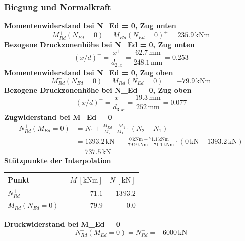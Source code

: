 \documentclass[11pt,a4paper]{article}
\begin{document}
\subsubsection{Biegung und Normalkraft}
\noindent\textbf{Momentenwiderstand bei N\_Ed = 0, Zug unten}
\begin{equation*}
M_{Rd}^{+}(N_{Ed} = 0) = M_{Rd}(N_{Ed}=0)^{+} = 235.9\,\mathrm{kNm}
\end{equation*}
\noindent\textbf{Bezogene Druckzonenhöhe bei N\_Ed = 0, Zug unten}
\begin{equation*}
\left(x/d\right)^{+} = \frac{x^{+}}{d_{2,x}} = \frac{62.7\,\mathrm{mm}}{248.1\,\mathrm{mm}} = 0.253
\end{equation*}
\noindent\textbf{Momentenwiderstand bei N\_Ed = 0, Zug oben}
\begin{equation*}
M_{Rd}^{-}(N_{Ed} = 0) = M_{Rd}(N_{Ed}=0)^{-} = -79.9\,\mathrm{kNm}
\end{equation*}
\noindent\textbf{Bezogene Druckzonenhöhe bei N\_Ed = 0, Zug oben}
\begin{equation*}
\left(x/d\right)^{-} = \frac{x^{-}}{d_{3,x}} = \frac{19.3\,\mathrm{mm}}{252\,\mathrm{mm}} = 0.077
\end{equation*}
\noindent\textbf{Zugwiderstand bei M\_Ed = 0}
\begin{equation*}
\begin{aligned}
  N_{Rd}^{+}(M_{Ed} = 0) &= N_1 + \frac{M_{Ed} - M_1}{M_2 - M_1} \cdot \left(N_2 - N_1\right) \\
  &= 1393.2\,\mathrm{kN} + \frac{0\,\mathrm{kNm} - 71.1\,\mathrm{kNm}}{-79.9\,\mathrm{kNm} - 71.1\,\mathrm{kNm}} \cdot \left(0\,\mathrm{kN} - 1393.2\,\mathrm{kN}\right) \\
  &= 737.5\,\mathrm{kN}
\end{aligned}
\end{equation*}
\noindent\textbf{Stützpunkte der Interpolation}
\begin{longtable}{lrr}
\hline
Punkt & $M\ [\mathrm{kNm}]$ & $N\ [\mathrm{kN}]$ \\
\hline
\endhead
$N_{Rd}^{+}$ & $71.1$ & $1393.2$ \\
$M_{Rd}(N_{Ed}=0)^{-}$ & $-79.9$ & $0.0$ \\
\hline
\end{longtable}
\noindent\textbf{Druckwiderstand bei M\_Ed = 0}
\begin{equation*}
N_{Rd}^{-}(M_{Ed} = 0) = N_{Rd}^{-} = -6000\,\mathrm{kN}
\end{equation*}
\end{document}
